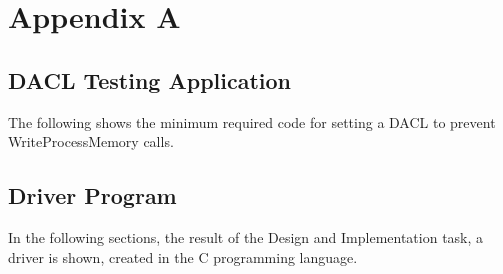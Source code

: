 \section{Appendix A}
\label{sec:appendix}

\subsection{DACL Testing Application}
The following shows the minimum required code for setting a DACL to prevent WriteProcessMemory calls.


\subsection{Driver Program}

In the following sections, the result of the Design and Implementation task, a driver is shown, created in the C programming language.
